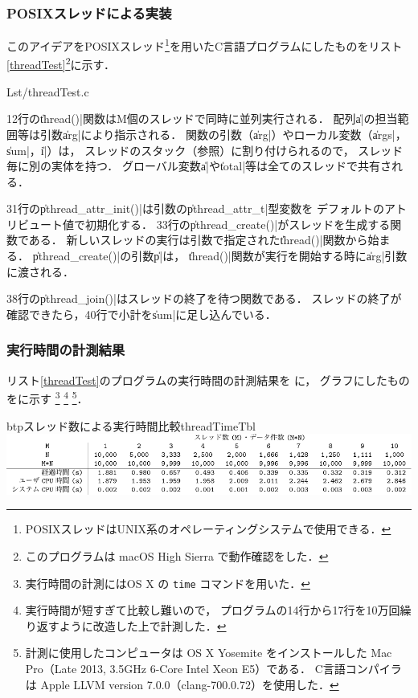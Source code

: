 \subsubsection{POSIXスレッドによる実装}
このアイデアをPOSIXスレッド\footnote{
  POSIXスレッドはUNIX系のオペレーティングシステムで使用できる．
}を用いたC言語プログラムにしたものをリスト\ref{threadTest}\footnote{
  このプログラムは macOS High Sierra で動作確認をした．
}に示す．


  {Lst/threadTest.c}

12行の\|thread()|関数はM個のスレッドで同時に並列実行される．
配列\|a|の担当範囲等は引数\|arg|により指示される．
関数の引数（\|arg|）やローカル変数（\|args|，\|sum|，\|i|）は，
スレッドのスタック（参照）に割り付けられるので，
スレッド毎に別の実体を持つ．
グローバル変数\|a|や\|total|等は全てのスレッドで共有される．

31行の\|pthread_attr_init()|は引数の\|pthread_attr_t|型変数を
デフォルトのアトリビュート値で初期化する．
33行の\|pthread_create()|がスレッドを生成する関数である．
新しいスレッドの実行は引数で指定された\|thread()|関数から始まる．
\|pthread_create()|の引数\|p|は，
\|thread()|関数が実行を開始する時に\|arg|引数に渡される．

38行の\|pthread_join()|はスレッドの終了を待つ関数である．
スレッドの終了が確認できたら，40行で小計を\|sum|に足し込んでいる．

\subsubsection{実行時間の計測結果}
リスト\ref{threadTest}のプログラムの実行時間の計測結果を
に，
グラフにしたものをに示す
\footnote{
  実行時間の計測にはOS X の \texttt{time} コマンドを用いた．
}
\footnote{
  実行時間が短すぎて比較し難いので，
  プログラムの14行から17行を10万回繰り返すように改造した上で計測した．}
\footnote{
  計測に使用したコンピュータは
  OS X Yosemite をインストールした
  Mac Pro（Late 2013, 3.5GHz 6-Core Intel Xeon E5）である．
  C言語コンパイラは
  Apple LLVM version 7.0.0（clang-700.0.72）を使用した．
}．

\begin{mytable}{btp}{スレッド数による実行時間比較}{threadTimeTbl}
  \includegraphics[scale=1.0]{Tbl/threadTimeTbl.pdf}
\end{mytable}

